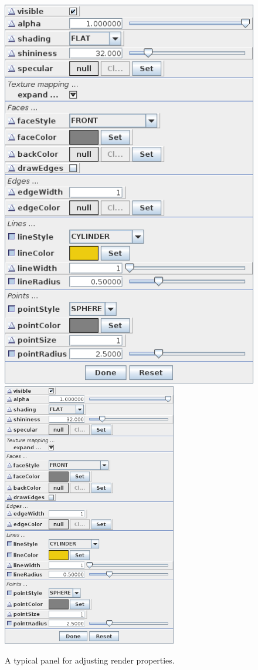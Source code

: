 \documentclass{article}
\begin{document}
\begin{figure}[h]
\begin{center}
\iflatexml
\includegraphics[]{images/renderProps}
\else
\includegraphics[width=3in]{images/renderProps}
\fi
\end{center}
\caption{A typical panel for adjusting render properties.}%
\label{renderpropsFig}
\end{figure}
\end{document}
